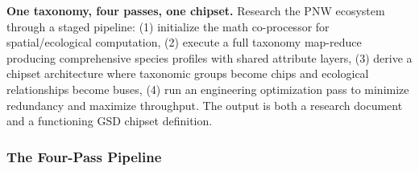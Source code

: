 \documentclass[11pt,letterpaper]{article}
\begin{document}
\begin{quotebox}
\textbf{One taxonomy, four passes, one chipset.} Research the PNW ecosystem through a staged pipeline: (1) initialize the math co-processor for spatial/ecological computation, (2) execute a full taxonomy map-reduce producing comprehensive species profiles with shared attribute layers, (3) derive a chipset architecture where taxonomic groups become chips and ecological relationships become buses, (4) run an engineering optimization pass to minimize redundancy and maximize throughput. The output is both a research document and a functioning GSD chipset definition.
\end{quotebox}

\subsubsection{The Four-Pass Pipeline}
\end{document}
